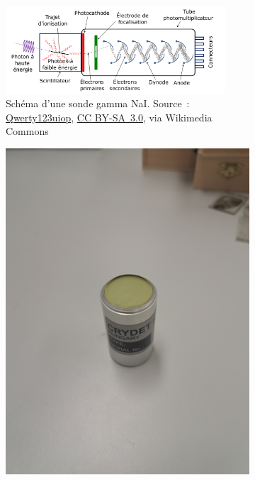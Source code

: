 \begin{figure}
    
    \begin{subfigure}{0.9\textwidth}
        \centering
        \includegraphics[width=0.9\textwidth]{img/she/Photomultiplier_coupled_to_a_scintillator_-_fr.png}
        \caption[Shema d'une sonde gamma NaI]{Schéma d'une sonde gamma NaI. Source~: \href{https://commons.wikimedia.org/wiki/File:Photomultiplier_coupled_to_a_scintillator_-_fr.png}{Qwerty123uiop}, \href{https://creativecommons.org/licenses/by-sa/3.0}{CC BY-SA~3.0}, via Wikimedia Commons}
        \label{fig_detecteur_gamma}
    \end{subfigure}
    \begin{subfigure}{0.45\textwidth}
        \centering
        \includegraphics[trim=1cm 2cm 3cm 4cm, clip=true, totalheight=0.5\textheight, angle=90]{img/photo/Crystal.jpg}

\end{subfigure}
\end{figure}
